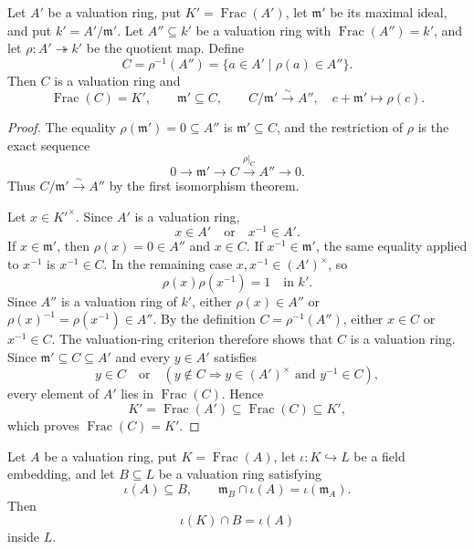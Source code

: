 \begin{lemma}
  \label{lemma:nagata-composite-valuation-ring}

  Let $A'$ be a valuation ring, put
  $K'=\operatorname{Frac}(A')$, let $\mathfrak m'$ be its maximal ideal, and
  put $k'=A'/\mathfrak m'$.  Let $A''\subseteq k'$ be a valuation ring with
  $\operatorname{Frac}(A'')=k'$, and let
  $\rho\colon A'\twoheadrightarrow k'$ be the quotient map.  Define
  \[
    C=\rho^{-1}(A'')=\{a\in A'\mid\rho(a)\in A''\}.
  \]
  Then $C$ is a valuation ring and
  \[
    \operatorname{Frac}(C)=K',
    \qquad
    \mathfrak m'\subseteq C,
    \qquad
    C/\mathfrak m'\xrightarrow{\sim}A'',\quad
    c+\mathfrak m'\longmapsto\rho(c).
  \]
\end{lemma}

\begin{proof}
  The equality $\rho(\mathfrak m')=0\subseteq A''$ is
  $\mathfrak m'\subseteq C$, and the restriction of $\rho$ is the exact
  sequence
  \[
    0\longrightarrow\mathfrak m'\longrightarrow C
      \xrightarrow{\rho|_C}A''\longrightarrow0.
  \]
  Thus $C/\mathfrak m'\xrightarrow{\sim}A''$ by the first isomorphism theorem.

  Let $x\in K'^\times$.  Since $A'$ is a valuation ring,
  \[
    x\in A'\quad\text{or}\quad x^{-1}\in A'.
  \]
  If $x\in\mathfrak m'$, then $\rho(x)=0\in A''$ and $x\in C$.  If
  $x^{-1}\in\mathfrak m'$, the same equality applied to $x^{-1}$ is
  $x^{-1}\in C$.  In the remaining case $x,x^{-1}\in(A')^\times$, so
  \[
    \rho(x)\rho(x^{-1})=1\quad\text{in }k'.
  \]
  Since $A''$ is a valuation ring of $k'$, either
  $\rho(x)\in A''$ or $\rho(x)^{-1}=\rho(x^{-1})\in A''$.  By the definition
  $C=\rho^{-1}(A'')$, either $x\in C$ or $x^{-1}\in C$.  The valuation-ring
  criterion therefore shows that $C$ is a valuation ring.  Since
  $\mathfrak m'\subseteq C\subseteq A'$ and every $y\in A'$ satisfies
  \[
    y\in C\quad\text{or}\quad
    (y\notin C\Rightarrow y\in(A')^\times\text{ and }y^{-1}\in C),
  \]
  every element of $A'$ lies in $\operatorname{Frac}(C)$.  Hence
  \[
    K'=\operatorname{Frac}(A')
       \subseteq\operatorname{Frac}(C)
       \subseteq K',
  \]
  which proves $\operatorname{Frac}(C)=K'$.
\end{proof}

\begin{lemma}
  \label{lemma:nagata-valuation-intersection}

  Let $A$ be a valuation ring, put $K=\operatorname{Frac}(A)$, let
  $\iota\colon K\hookrightarrow L$ be a field embedding, and let
  $B\subseteq L$ be a valuation ring satisfying
  \[
    \iota(A)\subseteq B,
    \qquad
    \mathfrak m_B\cap\iota(A)=\iota(\mathfrak m_A).
  \]
  Then
  \[
    \iota(K)\cap B=\iota(A)
  \]
  inside \(L\).
\end{lemma}

